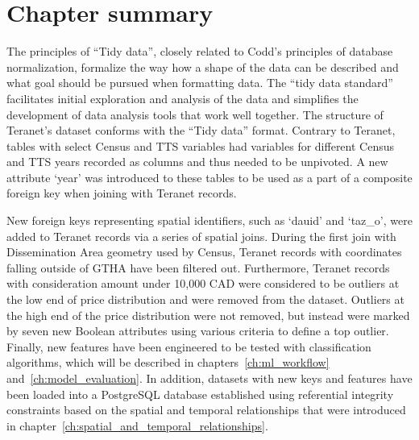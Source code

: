 \section{Chapter summary} \label{sec:data_preparation_summary}

The principles of ``Tidy data'', closely related to Codd's principles of database normalization, formalize the way how a shape of the data can be described and what goal should be pursued when formatting data.
The ``tidy data standard''  facilitates initial exploration and analysis of the data and simplifies the development of data analysis tools that work well together.
The structure of Teranet's dataset conforms with the ``Tidy data'' format.
Contrary to Teranet, tables with select Census and TTS variables had variables for different Census and TTS years recorded as columns and thus needed to be unpivoted.
A new attribute `year' was introduced to these tables to be used as a part of a composite foreign key when joining with Teranet records.

New foreign keys representing spatial identifiers, such as `dauid' and `taz\_o', were added to Teranet records via a series of spatial joins.
During the first join with Dissemination Area geometry used by Census, Teranet records with coordinates falling outside of GTHA have been filtered out.
Furthermore, Teranet records with consideration amount under 10,000 CAD were considered to be outliers at the low end of price distribution and were removed from the dataset.
Outliers at the high end of the price distribution were not removed, but instead were marked by seven new Boolean attributes using various criteria to define a top outlier.
Finally, new features have been engineered to be tested with classification algorithms, which will be described in chapters~\ref{ch:ml_workflow} and~\ref{ch:model_evaluation}.
In addition, datasets with new keys and features have been loaded into a PostgreSQL database established using referential integrity constraints based on the spatial and temporal relationships that were introduced in chapter~\ref{ch:spatial_and_temporal_relationships}.
